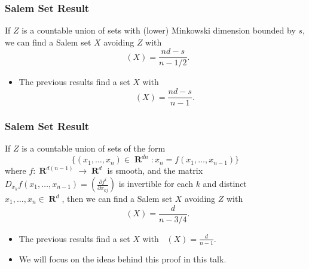 \documentclass[usenames,dvipsnames,handout]{beamer}
\DeclareMathOperator{\RR}{\textbf{R}}
\DeclareMathOperator{\fordim}{\text{dim}_{\textbf{F}}}
\DeclareMathOperator{\hausdim}{\text{dim}_{\textbf{H}}}
\begin{document}
\begin{frame}
    \frametitle{Salem Set Result}

    \pause
    \begin{theorem}
        If $Z$ is a countable union of sets with (lower) Minkowski dimension bounded by $s$, we can find a Salem set $X$ avoiding $Z$ with
        \[ \fordim(X) = \frac{nd - s}{n - 1/2}. \]
    \end{theorem}

    \begin{itemize}
        \item The previous results find a set $X$ with
        \[ \hausdim(X) = \frac{nd - s}{n - 1}. \]
    \end{itemize}
\end{frame}




\begin{frame}
    \frametitle{Salem Set Result}

    \pause
    \begin{theorem}
        If $Z$ is a countable union of sets of the form
        \[ \{ (x_1,\dots,x_n) \in \RR^{dn} : x_n = f(x_1,\dots,x_{n-1}) \} \]
        where $f: \RR^{d(n-1)} \to \RR^d$ is smooth, and the matrix $D_{x_k} f(x_1,\dots,x_{n-1}) = \left( \frac{\partial f^i}{\partial x_{kj}} \right)$ is invertible for each $k$ and distinct $x_1,\dots,x_n \in \RR^d$, then we can find a Salem set $X$ avoiding $Z$ with
        \[ \fordim(X) = \frac{d}{n - 3/4}. \]
    \end{theorem}

    \begin{itemize}
        \item The previous results find a set $X$ with $\hausdim(X) = \frac{d}{n - 1}$.

        \item We will focus on the ideas behind this proof in this talk.
    \end{itemize}
\end{frame}
\end{document}
